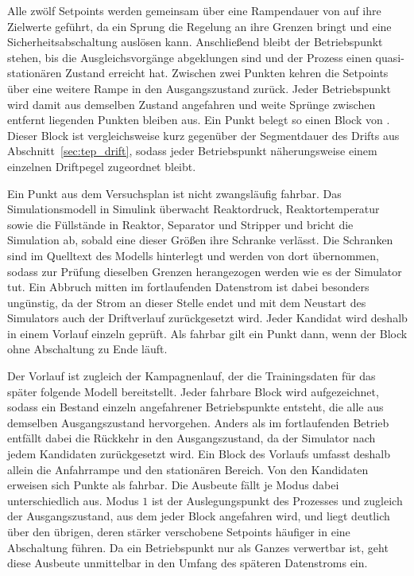 Alle zwölf Setpoints werden gemeinsam über eine Rampendauer von \paramRampH{} auf ihre Zielwerte geführt, da ein Sprung die Regelung an ihre Grenzen bringt und eine Sicherheitsabschaltung auslösen kann. Anschließend bleibt der Betriebspunkt stehen, bis die Ausgleichsvorgänge abgeklungen sind und der Prozess einen quasi-stationären Zustand erreicht hat.
Zwischen zwei Punkten kehren die Setpoints über eine weitere Rampe in den Ausgangszustand zurück. Jeder Betriebspunkt wird damit aus demselben Zustand angefahren und weite Sprünge zwischen entfernt liegenden Punkten bleiben aus. Ein Punkt belegt so einen Block von \paramBlockH{}. Dieser Block ist vergleichsweise kurz gegenüber der Segmentdauer des Drifts aus Abschnitt~\ref{sec:tep_drift}, sodass jeder Betriebspunkt näherungsweise einem einzelnen Driftpegel zugeordnet bleibt. \par
%
Ein Punkt aus dem Versuchsplan ist nicht zwangsläufig fahrbar. Das Simulationsmodell in Simulink überwacht Reaktordruck, Reaktortemperatur sowie die Füllstände in Reaktor, Separator und Stripper und bricht die Simulation ab, sobald eine dieser Größen ihre Schranke verlässt. Die Schranken sind im Quelltext des Modells hinterlegt und werden von dort übernommen, sodass zur Prüfung dieselben Grenzen herangezogen werden wie es der Simulator tut.
Ein Abbruch mitten im fortlaufenden Datenstrom ist dabei besonders ungünstig, da der Strom an dieser Stelle endet und mit dem Neustart des Simulators auch der Driftverlauf zurückgesetzt wird. Jeder Kandidat wird deshalb in einem Vorlauf einzeln geprüft. Als fahrbar gilt ein Punkt dann, wenn der Block ohne Abschaltung zu Ende läuft. \par
%
Der Vorlauf ist zugleich der Kampagnenlauf, der die Trainingsdaten für das später folgende Modell bereitstellt. Jeder fahrbare Block wird aufgezeichnet, sodass ein Bestand einzeln angefahrener Betriebspunkte entsteht, die alle aus demselben Ausgangszustand hervorgehen. Anders als im fortlaufenden Betrieb entfällt dabei die Rückkehr in den Ausgangszustand, da der Simulator nach jedem Kandidaten zurückgesetzt wird. Ein Block des Vorlaufs umfasst deshalb allein die Anfahrrampe und den stationären Bereich.
Von den \paramCandidates{} Kandidaten erweisen sich \genFeasible{} Punkte als fahrbar. Die Ausbeute fällt je Modus dabei unterschiedlich aus. Modus $1$ ist der Auslegungspunkt des Prozesses und zugleich der Ausgangszustand, aus dem jeder Block angefahren wird, und liegt deutlich über den übrigen, deren stärker verschobene Setpoints häufiger in eine Abschaltung führen. Da ein Betriebspunkt nur als Ganzes verwertbar ist, geht diese Ausbeute unmittelbar in den Umfang des späteren Datenstroms ein.

